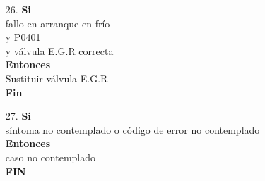 \documentclass[a4paper,12pt]{article}
\newcommand\tab[1][1cm]{\hspace*{#1}}
\begin{document}
\begin{itemize}
\item[26.]\textbf{Si}\\ \tab fallo en arranque en frío\\ \tab y P0401\\ \tab y válvula E.G.R correcta\\  \textbf{Entonces}\\ \tab Sustituir válvula E.G.R\\ \tab \textbf{Fin}
\item[27.]\textbf{Si}\\ \tab síntoma no contemplado o código de error no contemplado\\ \textbf{Entonces}\\ \tab caso no contemplado \\ \tab \textbf{FIN}
\end{itemize}
\end{document}
